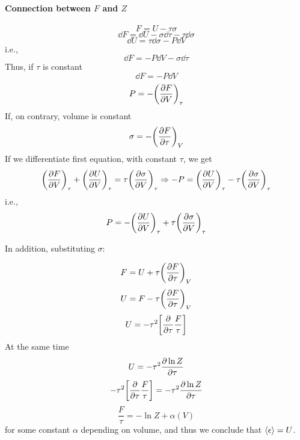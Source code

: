 \paragraph{Connection between $F$ and $Z$}
$$F = U -\tau \sigma$$
$$\dd{F} = \dd{U} -\sigma \dd{\tau} - \tau \dd{\sigma}$$
$$\dd{U} = \tau \dd{\sigma} - P\dd{V}$$
i.e.,
$$\dd{F} = -P\dd{V} - \sigma\dd{\tau}$$
Thus, if $\tau$ is constant
$$\dd{F} =- P\dd{V}$$
$$P = -\qty(\pdv{F}{V})_{\tau}$$
If, on contrary, volume is constant
$$\sigma = -\qty(\pdv{F}{\tau})_{V}$$
If we differentiate first equation, with constant $\tau$, we get
$$\qty(\pdv{F}{V})_{\tau} +\qty(\pdv{U}{V})_{\tau} = \tau\qty(\pdv{\sigma}{V})_{\tau} \Rightarrow -P = \qty(\pdv{U}{V})_{\tau} -\tau\qty(\pdv{\sigma}{V})_{\tau}$$
i.e.,
$$P = -\qty(\pdv{U}{V})_{\tau} +\tau\qty(\pdv{\sigma}{V})_{\tau}$$

In addition, substituting $\sigma$:

$$F = U  + \tau\qty(\pdv{F}{\tau})_{V} $$
$$U = F - \tau\qty(\pdv{F}{\tau})_{V}$$
$$U =- \tau^2 \qty[ \pdv{\tau} \frac{F}{\tau}]$$
At the same time
$$U = -\tau^2 \pdv{\ln Z}{\tau}$$
$$- \tau^2 \qty[ \pdv{\tau} \frac{F}{\tau}]  = -\tau^2 \pdv{\ln Z}{\tau}$$
$$ \frac{F}{\tau}  = -\ln Z + \alpha(V)$$
for some constant $\alpha$ depending on volume, and thus we conclude that $\expval{\epsilon} = U$.